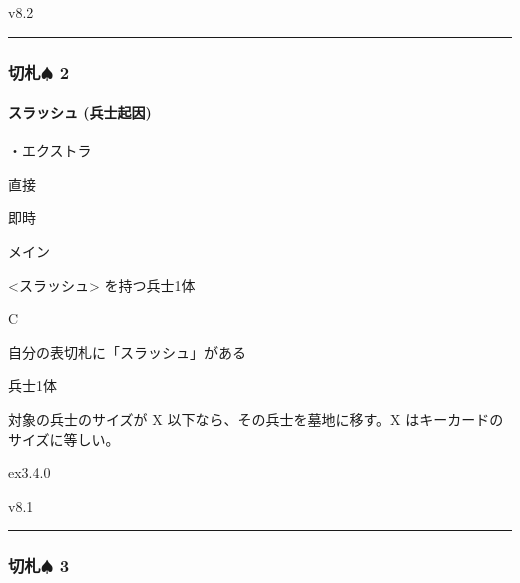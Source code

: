 \documentclass[letterpaper,10pt,dvipdfmx]{sphinxmanual}
\begin{document}
\sphinxAtStartPar
{}  v8.2


\bigskip\hrule\bigskip



\subsubsection{切札{\normalsize $\spadesuit$} 2}
\label{\detokenize{auto/frameActionlist:id15}}

\paragraph{スラッシュ (兵士起因)}
\label{\detokenize{auto/frameActionlist:act-slash}}\label{\detokenize{auto/frameActionlist:id16}}
\sphinxAtStartPar
{}

\sphinxAtStartPar
・エクストラ

\sphinxAtStartPar
{} 直接

\sphinxAtStartPar
{} 即時

\sphinxAtStartPar
{} メイン

\sphinxAtStartPar
{} \textless{}スラッシュ\textgreater{} を持つ兵士1体

\sphinxAtStartPar
{} C

\sphinxAtStartPar
{}

\sphinxAtStartPar
自分の表切札に「スラッシュ」がある

\sphinxAtStartPar
{}

\sphinxAtStartPar
兵士1体

\sphinxAtStartPar
{}

\sphinxAtStartPar
対象の兵士のサイズが X 以下なら、その兵士を墓地に移す。X はキーカードのサイズに等しい。

\sphinxAtStartPar
{}  ex3.4.0

\sphinxAtStartPar
{}  v8.1


\bigskip\hrule\bigskip



\subsubsection{切札{\normalsize $\spadesuit$} 3}
\label{\detokenize{auto/frameActionlist:id17}}
\end{document}
